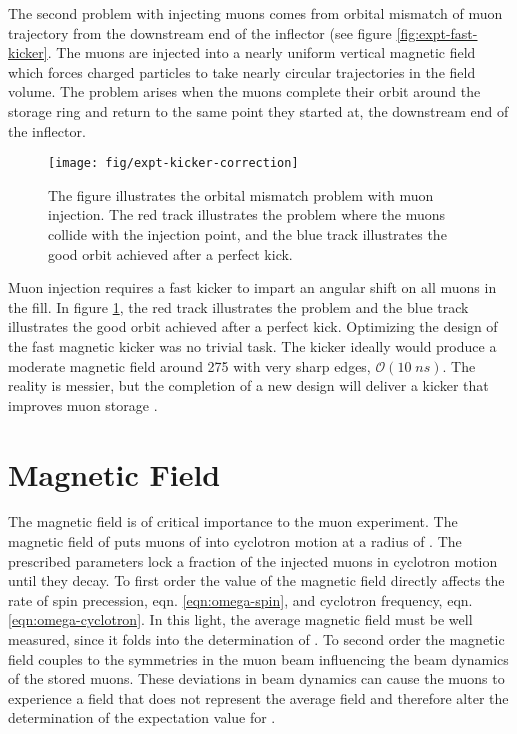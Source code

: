 The second problem with injecting muons comes from orbital mismatch of muon trajectory from the downstream end of the inflector (see figure \ref{fig:expt-fast-kicker}.  The muons are injected into a nearly uniform vertical magnetic field which forces charged particles to take nearly circular trajectories in the field volume.  The problem arises when the muons complete their orbit around the storage ring and return to the same point they started at, the downstream end of the inflector.

\begin{figure}
\label{fig:expt-kicker-correction}
\centering
\texttt{[image: fig/expt-kicker-correction]}
\caption{The figure illustrates the orbital mismatch problem with muon injection.  The red track illustrates the problem where the muons collide with the injection point, and the blue track illustrates the good orbit achieved after a perfect kick.}
\end{figure}

Muon injection requires a fast kicker to impart an angular shift on all muons in the fill. In figure \ref{fig:expt-kicker-correction}, the red track illustrates the problem and the blue track illustrates the good orbit achieved after a perfect kick. Optimizing the design of the \gmtwo fast magnetic kicker was no trivial task.  The kicker ideally would produce a moderate magnetic field around \SI{275}{\gauss} with very sharp edges, $\mathcal{O}(10\;ns)$. The reality is messier, but the completion of a new design will deliver a kicker that improves muon storage \cite{e989-tdr}.  

\section{Magnetic Field} \label{sec:magnetic-field}

The magnetic field is of critical importance to the muon \gmtwo experiment.  The magnetic field of \bmagic puts muons of \pmagic into cyclotron motion at a radius of \rmagic.  The prescribed parameters lock a fraction of the injected muons in cyclotron motion until they decay.  To first order the value of the magnetic field directly affects the rate of spin precession, eqn. \ref{eqn:omega-spin}, and cyclotron frequency, eqn. \ref{eqn:omega-cyclotron}.  In this light, the average magnetic field must be well measured, since it folds into the determination of \wa.  To second order the magnetic field couples to the symmetries in the muon beam influencing the beam dynamics of the stored muons.  These deviations in beam dynamics can cause the muons to experience a field that does not represent the average field and therefore alter the determination of the expectation value for \wa.


